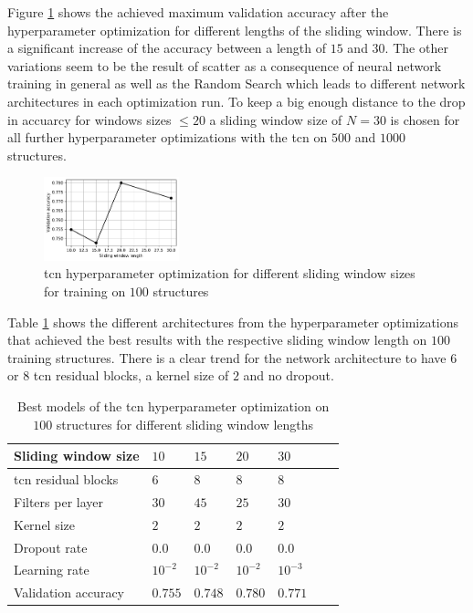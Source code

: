 \documentclass[conference]{IEEEtran}
\begin{document}
Figure \ref{fig:influence_sequence_length_tcn} shows the achieved maximum validation accuracy after the hyperparameter optimization for different lengths of the sliding window. There is a significant increase of the accuracy between a length of $ 15 $ and $ 30 $. The other variations seem to be the result of scatter as a consequence of neural network training in general as well as the Random Search which leads to different network architectures in each optimization run. To keep a big enough distance to the drop in accuarcy for windows sizes $ \leq 20 $ a sliding window size of $ N = 30 $ is chosen for all further hyperparameter optimizations with the \gls{tcn} on $ 500 $ and $ 1000 $ structures.

\begin{figure}[htp]
	\centering
	\includegraphics[width=0.35\textwidth]{python/influence_sequence_length_tcn.pdf}
	\caption{\gls{tcn} hyperparameter optimization for different sliding window sizes for training on $ 100 $ structures}
	\label{fig:influence_sequence_length_tcn}
\end{figure}

Table \ref{tab:hyperparameters_100_structures_tcn} shows the different architectures from the hyperparameter optimizations that achieved the best results with the respective sliding window length on $ 100 $ training structures. There is a clear trend for the network architecture to have $ 6 $ or $ 8 $ \gls{tcn} residual blocks, a kernel size of $ 2 $ and no dropout.

\begin{table}[htp]
	\centering
	\caption{Best models of the \gls{tcn} hyperparameter optimization on $ 100 $ structures for different sliding window lengths}
	\label{tab:hyperparameters_100_structures_tcn}
	\begin{tabular}{l|llllll}
		Sliding window size & $ 10 $ & $ 15 $ & $ 20 $ & $ 30 $ \\
		\hline
		\gls{tcn} residual blocks & $ 6 $ & $ 8 $ & $ 8 $ & $ 8 $ \\
		Filters per layer & $ 30 $ & $ 45 $ & $ 25 $ & $ 30 $ \\
		Kernel size & $ 2 $ & $ 2 $ & $ 2 $ & $ 2 $ \\
		Dropout rate & $ 0.0 $ & $ 0.0 $ & $ 0.0 $ & $ 0.0 $ \\
		Learning rate & $ 10^{-2} $ & $ 10^{-2} $ & $ 10^{-2} $ & $ 10^{-3} $ \\
		\hline
		Validation accuracy & $ 0.755 $ & $ 0.748 $ & $ 0.780 $ & $ 0.771 $
	\end{tabular}
\end{table}
\end{document}
